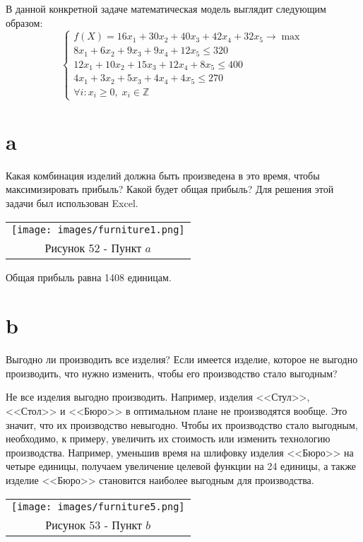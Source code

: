 \documentclass[12pt]{article}
\theoremstyle{definition}
\theoremstyle{remark}
\begin{document}
В данной конкретной задаче математическая модель выглядит следующим образом:
$$\begin{cases}
    f(X) = 16 x_1 + 30 x_2 + 40 x_3 + 42 x_4 + 32 x_5 \rightarrow \max \\
    8 x_1 + 6 x_2 + 9 x_3 + 9 x_4 + 12 x_5 \leqslant 320 \\
    12 x_1 + 10 x_2 + 15 x_3 + 12 x_4 + 8 x_5 \leqslant 400 \\
    4 x_1 + 3 x_2 + 5 x_3 + 4 x_4 + 4 x_5 \leqslant 270 \\
    \forall i: x_i \geqslant 0, \; x_i \in \mathbb{Z}
\end{cases}$$

\section*{a}
Какая комбинация изделий должна быть произведена в это время, чтобы максимизировать прибыль? Какой будет общая прибыль?
Для решения этой задачи был использован Excel.

\begin{center}
  \begin{tabular}{c}
\texttt{[image: images/furniture1.png]}\\
Рисунок 52 - Пункт $a$
\end{tabular}
\end{center}

Общая прибыль равна 1408 единицам.

\section*{b}
Выгодно ли производить все изделия? Если имеется изделие, которое не выгодно производить, что нужно изменить, чтобы его производство стало выгодным?

Не все изделия выгодно производить. Например, изделия <<Стул>>, <<Стол>> и <<Бюро>> в оптимальном плане не производятся вообще. Это значит, что их производство невыгодно. Чтобы их производство стало выгодным, необходимо, к примеру, увеличить их стоимость или изменить технологию производства. Например, уменьшив время на шлифовку изделия <<Бюро>> на четыре единицы, получаем увеличение целевой функции на 24 единицы, а также изделие <<Бюро>> становится наиболее выгодным для производства.

\begin{center}
  \begin{tabular}{c}
\texttt{[image: images/furniture5.png]}\\
Рисунок 53 - Пункт $b$
\end{tabular}
\end{center}
\end{document}
